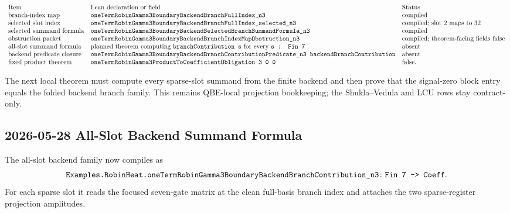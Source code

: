 \[
\begin{array}{lll}
\text{Item} & \text{Lean declaration or field} & \text{Status}\\
\text{branch-index map} &
\texttt{oneTermRobinGamma3BoundaryBackendBranchFullIndex\_n3} &
\text{compiled}\\
\text{selected slot index} &
\texttt{oneTermRobinGamma3BoundaryBackendBranchFullIndex\_selected\_n3} &
\text{compiled; slot }2\text{ maps to }32\\
\text{selected summand formula} &
\texttt{oneTermRobinGamma3BoundaryBackendSelectedBranchSummandFormula\_n3} &
\text{compiled}\\
\text{obstruction packet} &
\texttt{oneTermRobinGamma3BoundaryBackendBranchIndexMapObstruction\_n3} &
\text{compiled; theorem-facing fields false}\\
\text{all-slot summand formula} &
\text{planned theorem computing }\texttt{branchContribution s}\text{ for every }\texttt{s : Fin 7} &
\text{absent}\\
\text{backend predicate closure} &
\texttt{oneTermRobinGamma3BoundaryBackendBranchContributionPredicate\_n3 backendBranchContribution} &
\text{absent}\\
\text{fixed product theorem} &
\texttt{oneTermRobinGamma3ProductToCoefficientObligation\ 3\ 0\ 0} &
\text{false}.
\end{array}
\]

The next local theorem must compute every sparse-slot summand from the finite
backend and then prove that the signal-zero block entry equals the folded
backend branch family.  This remains QBE-local projection bookkeeping; the
Shukla--Vedula and LCU rows stay contract-only.

\subsection{2026-05-28 All-Slot Backend Summand Formula}

The all-slot backend family now compiles as
\[
  \texttt{Examples.RobinHeat.oneTermRobinGamma3BoundaryBackendBranchContribution\_n3}
  \colon \texttt{Fin 7 -> Coeff}.
\]
For each sparse slot it reads the focused seven-gate matrix at the clean
full-basis branch index and attaches the two sparse-register projection
amplitudes.

